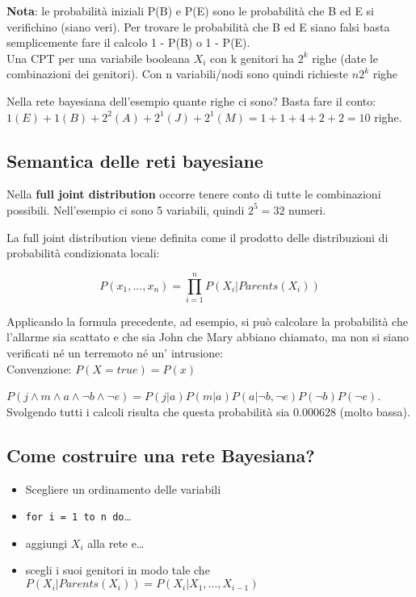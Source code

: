\textbf{Nota}: le probabilità iniziali P(B) e P(E) sono le probabilità
che B ed E si verifichino (siano veri). Per trovare le probabilità che
B ed E siano falsi basta semplicemente fare il calcolo 1 - P(B) o 1 -
P(E).\\

Una CPT per una variabile booleana $X_i$ con k genitori ha $2^k$ righe
(date le combinazioni dei genitori). Con n variabili/nodi sono quindi
richieste $n2^k$ righe

Nella rete bayesiana dell'esempio quante righe ci sono? Basta fare il
conto: $1 (E) + 1 (B) + 2^2 (A) + 2^1 (J) + 2^1 (M) = 1 + 1 + 4 + 2 + 2
= 10$ righe.

\subsection{Semantica delle reti bayesiane}

Nella \textbf{full joint distribution} occorre tenere conto di tutte
le combinazioni possibili. Nell'esempio ci sono 5 variabili, quindi
$2^5 = 32$ numeri.

La full joint distribution viene definita come il prodotto delle
distribuzioni di probabilità condizionata locali: 

\begin{equation}
 P(x_1, ..., x_n) = \prod_{i=1}^n P(X_i | Parents(X_i))
\end{equation}

Applicando la formula precedente, ad esempio, si può calcolare
la probabilità che l'allarme sia scattato e che sia John che Mary
abbiano chiamato, ma non si siano verificati né un terremoto né un'
intrusione:\\

Convenzione: $P(X = true) = P(x)$

$P(j \land m \land a \land \neg b \land \neg e) = P(j|a)P(m|a)
P(a|\neg b, \neg e) P(\neg b) P(\neg e)$.\\

Svolgendo tutti i calcoli risulta che questa probabilità sia 0.000628
(molto bassa).

\subsection{Come costruire una rete Bayesiana?}

\begin{itemize}
 \item Scegliere un ordinamento delle variabili
 \item \texttt{for i = 1 to n do}\dots
 \item aggiungi $X_i$ alla rete e\dots
 \item scegli i suoi genitori in modo tale che
 $P(X_i | Parents(X_i)) = P(X_i| X_1, ..., X_{i-1})$
\end{itemize}

